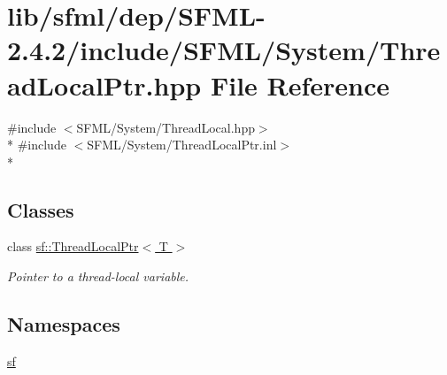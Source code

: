 \hypertarget{sfml_2dep_2_s_f_m_l-2_84_82_2include_2_s_f_m_l_2_system_2_thread_local_ptr_8hpp}{\section{lib/sfml/dep/\-S\-F\-M\-L-\/2.4.2/include/\-S\-F\-M\-L/\-System/\-Thread\-Local\-Ptr.hpp File Reference}
\label{sfml_2dep_2_s_f_m_l-2_84_82_2include_2_s_f_m_l_2_system_2_thread_local_ptr_8hpp}
}
{\ttfamily \#include $<$S\-F\-M\-L/\-System/\-Thread\-Local.\-hpp$>$}\\*
{\ttfamily \#include $<$S\-F\-M\-L/\-System/\-Thread\-Local\-Ptr.\-inl$>$}\\*
\subsection*{Classes}
\begin{DoxyCompactItemize}
\item 
class \hyperlink{classsf_1_1_thread_local_ptr}{sf\-::\-Thread\-Local\-Ptr$<$ T $>$}
\begin{DoxyCompactList}\small\item\em Pointer to a thread-\/local variable. \end{DoxyCompactList}\end{DoxyCompactItemize}
\subsection*{Namespaces}
\begin{DoxyCompactItemize}
\item 
\hyperlink{namespacesf}{sf}
\end{DoxyCompactItemize}
